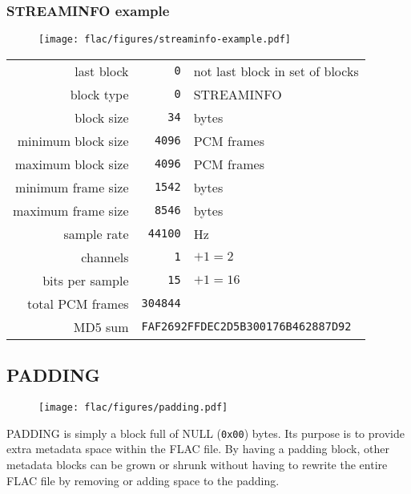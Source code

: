 \clearpage

\subsubsection{STREAMINFO example}
\begin{figure}[h]
  \texttt{[image: flac/figures/streaminfo-example.pdf]}
\end{figure}
\begin{tabular}{rrl}
last block & \texttt{0} & not last block in set of blocks \\
block type & \texttt{0} & STREAMINFO \\
block size & \texttt{34} & bytes \\
minimum block size & \texttt{4096} & PCM frames \\
maximum block size & \texttt{4096} & PCM frames \\
minimum frame size & \texttt{1542} & bytes \\
maximum frame size & \texttt{8546} & bytes \\
sample rate & \texttt{44100} & Hz \\
channels & \texttt{1} & $+ 1 = 2$ \\
bits per sample & \texttt{15} & $+ 1 = 16$ \\
total PCM frames & \texttt{304844} & \\
MD5 sum & \multicolumn{2}{l}{\texttt{FAF2692FFDEC2D5B300176B462887D92}} \\
\end{tabular}

\clearpage

\subsection{PADDING}
\begin{figure}[h]
  \texttt{[image: flac/figures/padding.pdf]}
\end{figure}
\par
\noindent
PADDING is simply a block full of NULL (\texttt{0x00}) bytes.
Its purpose is to provide extra metadata space within the FLAC file.
By having a padding block, other metadata blocks can be grown or
shrunk without having to rewrite the entire FLAC file by removing or
adding space to the padding.


